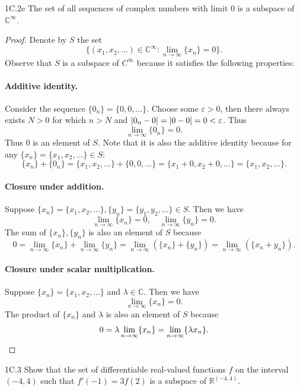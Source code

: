 \documentclass{exam}
\begin{document}
\begin{problem}{1C.2e}
    The set of all sequences of complex numbers with limit $0$ is a subspace of $\mathbb C^{\infty}$.
\end{problem}

\begin{proof}
    Denote by $S$ the set \[
        \{(x_1, x_2,\dots)\in\mathbb C^{\infty}: \lim_{n\to\infty}\{x_n\} = 0\}.
    \]
    Observe that $S$ is a subspace of $C^{\infty}$ because it satisfies the following properties:
    \paragraph{Additive identity.} Consider the sequence $\{0_n\} = \{0, 0,\dots\}$. Choose some $\varepsilon>0$, then there always exists $N > 0$ for which $n > N$ and $\abs{0_n - 0} = \abs{0 - 0} = 0 < \varepsilon$. Thus \[
        \lim_{n\to\infty}\{0_n\} = 0.
    \]
    Thus $0$ is an element of $S$. Note that it is also the additive identity because for any $\{x_n\} = \{x_1, x_2,\dots\}\in S$: \[
        \{x_n\} + \{0_n\} = \{x_1, x_2,\dots\} + \{0, 0,\dots\} = \{x_1 + 0, x_2 + 0,\dots\} = \{x_1, x_2,\dots\}.
    \]

    \paragraph{Closure under addition.} Suppose $\{x_n\} = \{x_1, x_2, \dots\}, \{y_n\} = \{y_1, y_2, \dots\}\in S$. Then we have \[
        \lim_{n\to\infty}\{x_n\} = 0, \quad\lim_{n\to\infty}\{y_n\} = 0.
    \]
    The sum of $\{x_n\}, \{y_n\}$ is also an element of $S$ because \[
        0 = \lim_{n\to\infty}\{x_n\} + \lim_{n\to\infty}\{y_n\} = \lim_{n\to\infty}(\{x_n\} + \{y_n\}) = \lim_{n\to\infty}(\{x_n + y_n\}).
    \]

    \paragraph{Closure under scalar multiplication.} Suppose $\{x_n\} = \{x_1, x_2, \dots\}$ and $\lambda\in\mathbb C$. Then we have \[
        \lim_{n\to\infty}\{x_n\} = 0.
    \]
    The product of $\{x_n\}$ and $\lambda$ is also an element of $S$ because \[
        0 = \lambda\lim_{n\to\infty}\{x_n\} = \lim_{n\to\infty}\{\lambda x_n\}.\qedhere
    \]
\end{proof}

\begin{problem}{1C.3}
    Show that the set of differentiable real-valued functions $f$ on the interval $(-4, 4)$ such that $f'(-1) = 3f(2)$ is a subspace of $\mathbb R^{(-4, 4)}$.
\end{problem}
\end{document}
